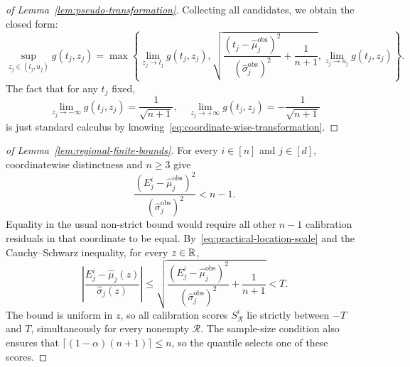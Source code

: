 \begin{proof}[of Lemma~\ref{lem:pseudo-transformation}]
Collecting all candidates, we obtain the closed form:
\[
\sup_{z_j \in (l_j, u_j)} g(t_j, z_j)
=\max\left\{\lim_{z_j \rightarrow l_j}g(t_j,z_j), \sqrt{\frac{(t_j-\hat{\mu}^\mathrm{obs}_j)^2}{(\hat{\sigma}^\mathrm{obs}_j)^2}+\frac{1}{n+1}}, \lim_{z_j \rightarrow u_j}g(t_j,z_j)\right\}.
\]
The fact that for any $t_j$ fixed,
\[
\lim_{z_j \rightarrow -\infty}g(t_j,z_j) = \frac{1}{\sqrt{n+1}}, \quad \lim_{z_j \rightarrow +\infty}g(t_j,z_j) = -\frac{1}{\sqrt{n+1}}
\]
is just standard calculus by knowing~\eqref{eq:coordinate-wise-transformation}.
\end{proof}

\begin{proof}[of Lemma~\ref{lem:regional-finite-bounds}]
For every $i\in[n]$ and $j\in[d]$, coordinatewise distinctness and $n\geq3$ give
\[
\frac{(E_j^i-\hat\mu_j^{\mathrm{obs}})^2}
{(\hat\sigma_j^{\mathrm{obs}})^2}<n-1.
\]
Equality in the usual non-strict bound would require all other $n-1$ calibration residuals in that coordinate to be equal. By~\eqref{eq:practical-location-scale} and the Cauchy--Schwarz inequality, for every $z\in\mathbb{R}$,
\[
\left|\frac{E_j^i-\hat\mu_j(z)}{\hat\sigma_j(z)}\right|
\leq
\sqrt{
\frac{(E_j^i-\hat\mu_j^{\mathrm{obs}})^2}
{(\hat\sigma_j^{\mathrm{obs}})^2}
+\frac1{n+1}}
<T.
\]
The bound is uniform in $z$, so all calibration scores $S^i_{\mathcal R}$ lie strictly between $-T$ and $T$, simultaneously for every nonempty $\mathcal R$. The sample-size condition also ensures that
$\lceil(1-\alpha)(n+1)\rceil\leq n$, so the quantile selects one of these scores.
\end{proof}


